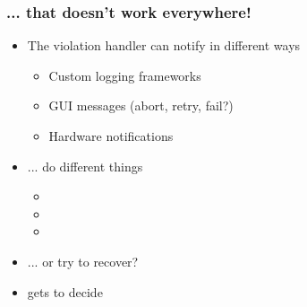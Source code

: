
\begin{frame}[fragile]
  \frametitle{... that doesn't work everywhere!}

  \begin{itemize}
  \item The violation handler can notify in different ways \pause
    \begin{itemize}
    \item Custom logging frameworks \pause
    \item GUI messages (abort, retry, fail?) \pause
    \item Hardware notifications \pause
    \end{itemize}
  \item ... do different things \pause
    \begin{itemize}
    \item {} \pause
    \item {} \pause
    \item {} \pause
    \end{itemize}
  \item ... or try to recover? \pause
  \item {} gets to decide
  \end{itemize}
\end{frame}

